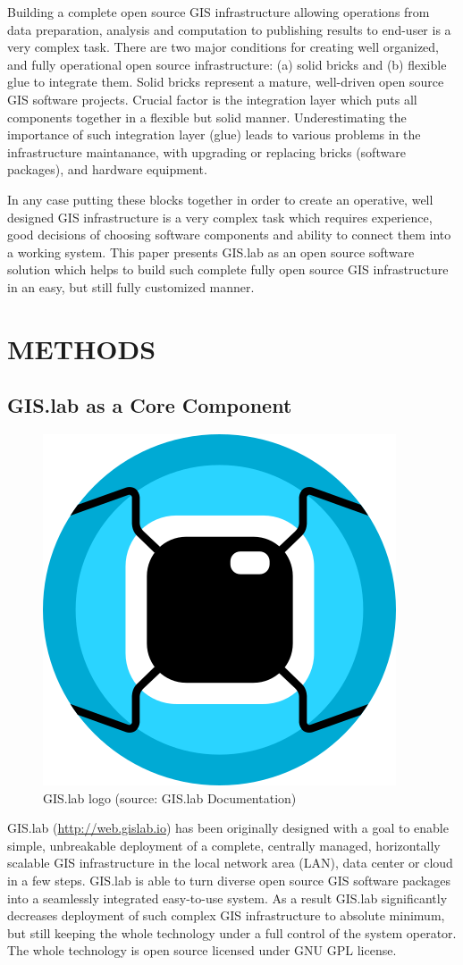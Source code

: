 \documentclass{isprs}
\begin{document}
Building a complete open source GIS infrastructure allowing operations
from data preparation, analysis and computation to publishing results
to end-user is a very complex task. There are two major conditions for
creating well organized, and fully operational open source
infrastructure: (a) solid bricks and (b) flexible glue to integrate
them. Solid bricks represent a mature, well-driven open source GIS
software projects. Crucial factor is the integration layer which puts all components
together in a flexible but solid manner. Underestimating the
importance of such integration layer (glue) leads to various problems in the 
infrastructure maintanance, with upgrading or replacing bricks (software packages), and
hardware equipment.

In any case putting these blocks together in order to create an operative, well
designed GIS infrastructure is a very complex task which requires
experience, good decisions of choosing software components and ability
to connect them into a working system. This paper presents GIS.lab as
an open source software solution which helps to build such complete fully
open source GIS infrastructure in an easy, but still fully customized
manner.

\section{METHODS}

\subsection{GIS.lab as a Core Component}

\begin{figure}[ht!]
\begin{center}
  \includegraphics[width=.15\columnwidth]{figures/gislab-logo.png}
  \caption{GIS.lab logo (source: GIS.lab Documentation)}
\label{fig:gislab_logo}
\end{center}
\end{figure}

GIS.lab (\url{http://web.gislab.io}) has been originally designed with
a goal to enable simple, unbreakable deployment of a complete,
centrally managed, horizontally scalable GIS infrastructure in the
local network area (LAN), data center or cloud in a few steps. GIS.lab
is able to turn diverse open source GIS software packages into a
seamlessly integrated easy-to-use system. As a result GIS.lab
significantly decreases deployment of such complex GIS infrastructure
to absolute minimum, but still keeping the whole technology under a
full control of the system operator. The whole technology is open
source licensed under GNU GPL license.
\end{document}
